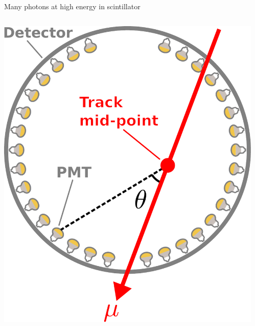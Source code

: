 \documentclass[14pt]{beamer}
\begin{document}
\begin{frame}{Many photons at high energy in scintillator}
	\begin{columns}[T]
		\begin{block}{}
			\includegraphics[width=\linewidth]{through_going_muon.pdf}
		\end{block}
		\begin{block}{}
\end{block}
\end{columns}
\end{frame}
\end{document}
